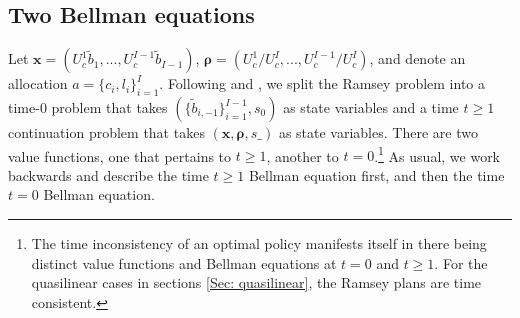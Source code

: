 \documentclass[thmsb,11pt]{article}
\begin{document}
%

\color{black}







\subsection{Two Bellman equations}\label{sec: two bellman equation}
Let $\bm{x}= \left( U_{c}^{1}\tilde{b}_{1},...,U_{c}^{I-1}\tilde{b}_{I-1}\right)$, $\bm{\rho }=\left( U_{c}^{1}/U_{c}^{I},...,U_{c}^{I-1}/U_{c}^{I}\right) $, and denote an allocation $a=\{c_i,l_i\}^{I}_{i=1}.$
Following \cite{Kydland1980} and \cite{Farhi2010}, we split the Ramsey problem into a time-$0$ problem that takes $(\{\tilde{b}_{i,-1}\}^{I-1}_{i=1}, s_0)$ as state variables
and   a time $t \geq 1$ continuation problem  that takes $(\bm x,\bm \rho,s\_)$ as state variables. There are
two value functions, one that pertains to $t\geq 1$, another to $t=0$.\footnote{The time inconsistency of an optimal policy
manifests itself in there being distinct value functions and Bellman equations at $t =0$ and $t \geq 1$. For the quasilinear cases in sections \ref{Sec: quasilinear}, the Ramsey plans are time consistent.}  As usual, we work backwards and describe the time $t \geq 1$ Bellman equation
first, and then the time $t=0$ Bellman equation.
\end{document}
